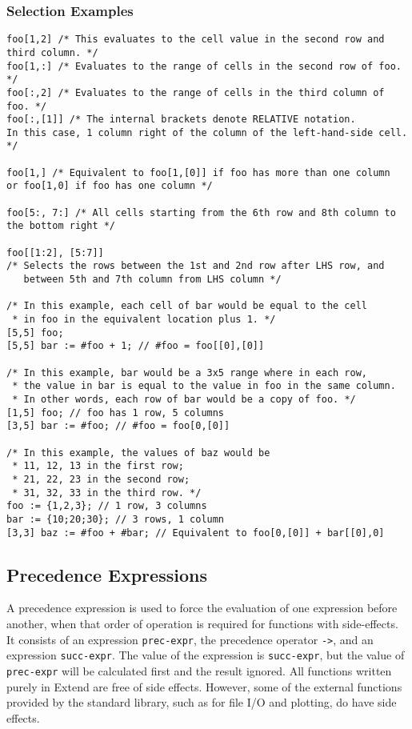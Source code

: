\subsubsection{Selection Examples}
\begin{lstlisting}
foo[1,2] /* This evaluates to the cell value in the second row and third column. */
foo[1,:] /* Evaluates to the range of cells in the second row of foo. */
foo[:,2] /* Evaluates to the range of cells in the third column of foo. */
foo[:,[1]] /* The internal brackets denote RELATIVE notation.
In this case, 1 column right of the column of the left-hand-side cell. */

foo[1,] /* Equivalent to foo[1,[0]] if foo has more than one column
or foo[1,0] if foo has one column */

foo[5:, 7:] /* All cells starting from the 6th row and 8th column to the bottom right */

foo[[1:2], [5:7]]
/* Selects the rows between the 1st and 2nd row after LHS row, and
   between 5th and 7th column from LHS column */

/* In this example, each cell of bar would be equal to the cell
 * in foo in the equivalent location plus 1. */
[5,5] foo;
[5,5] bar := #foo + 1; // #foo = foo[[0],[0]]

/* In this example, bar would be a 3x5 range where in each row,
 * the value in bar is equal to the value in foo in the same column.
 * In other words, each row of bar would be a copy of foo. */
[1,5] foo; // foo has 1 row, 5 columns
[3,5] bar := #foo; // #foo = foo[0,[0]]

/* In this example, the values of baz would be
 * 11, 12, 13 in the first row;
 * 21, 22, 23 in the second row;
 * 31, 32, 33 in the third row. */
foo := {1,2,3}; // 1 row, 3 columns
bar := {10;20;30}; // 3 rows, 1 column
[3,3] baz := #foo + #bar; // Equivalent to foo[0,[0]] + bar[[0],0]

\end{lstlisting}
\subsection{Precedence Expressions}
A precedence expression is used to force the evaluation of one expression before another, when that order of operation is required for functions with side-effects. It consists of an expression \texttt{prec-expr}, the precedence operator \texttt{->}, and an expression \texttt{succ-expr}. The value of the expression is \texttt{succ-expr}, but the value of \texttt{prec-expr} will be calculated first and the result ignored. All functions written purely in Extend are free of side effects. However, some of the external functions provided by the standard library, such as for file I/O and plotting, do have side effects.
